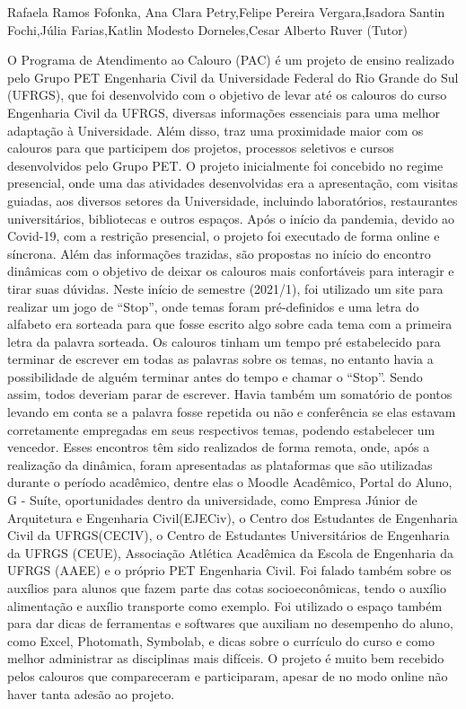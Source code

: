 Rafaela Ramos Fofonka, Ana Clara Petry,Felipe Pereira Vergara,Isadora Santin Fochi,Júlia Farias,Katlin Modesto Dorneles,Cesar Alberto Ruver (Tutor)

O Programa de Atendimento ao Calouro (PAC) é um projeto de ensino realizado pelo
Grupo PET Engenharia Civil da Universidade Federal do Rio Grande do Sul (UFRGS), que foi
desenvolvido com o objetivo de levar até os calouros do curso Engenharia Civil da UFRGS,
diversas informações essenciais para uma melhor adaptação à Universidade. Além disso, traz
uma proximidade maior com os calouros para que participem dos projetos, processos seletivos e
cursos desenvolvidos pelo Grupo PET. O projeto inicialmente foi concebido no regime
presencial, onde uma das atividades desenvolvidas era a apresentação, com visitas guiadas, aos
diversos setores da Universidade, incluindo laboratórios, restaurantes universitários, bibliotecas e
outros espaços. Após o início da pandemia, devido ao Covid-19, com a restrição presencial, o
projeto foi executado de forma online e síncrona. Além das informações trazidas, são propostas
no início do encontro dinâmicas com o objetivo de deixar os calouros mais confortáveis para
interagir e tirar suas dúvidas. Neste início de semestre (2021/1), foi utilizado um site para
realizar um jogo de “Stop”, onde temas foram pré-definidos e uma letra do alfabeto era sorteada
para que fosse escrito algo sobre cada tema com a primeira letra da palavra sorteada. Os calouros
tinham um tempo pré estabelecido para terminar de escrever em todas as palavras sobre os
temas, no entanto havia a possibilidade de alguém terminar antes do tempo e chamar o “Stop”.
Sendo assim, todos deveriam parar de escrever. Havia também um somatório de pontos levando
em conta se a palavra fosse repetida ou não e conferência se elas estavam corretamente
empregadas em seus respectivos temas, podendo estabelecer um vencedor. Esses encontros têm
sido realizados de forma remota, onde, após a realização da dinâmica, foram apresentadas as
plataformas que são utilizadas durante o período acadêmico, dentre elas o Moodle Acadêmico,
Portal do Aluno, G - Suíte, oportunidades dentro da universidade, como Empresa Júnior de
Arquitetura e Engenharia Civil(EJECiv), o Centro dos Estudantes de Engenharia Civil da
UFRGS(CECIV), o Centro de Estudantes Universitários de Engenharia da UFRGS (CEUE),
Associação Atlética Acadêmica da Escola de Engenharia da UFRGS (AAEE) e o próprio PET
Engenharia Civil. Foi falado também sobre os auxílios para alunos que fazem parte das cotas
socioeconômicas, tendo o auxílio alimentação e auxílio transporte como exemplo. Foi utilizado o
espaço também para dar dicas de ferramentas e softwares que auxiliam no desempenho do aluno,
como Excel, Photomath, Symbolab, e dicas sobre o currículo do curso e como melhor
administrar as disciplinas mais difíceis. O projeto é muito bem recebido pelos calouros que
compareceram e participaram, apesar de no modo online não haver tanta adesão ao projeto.


